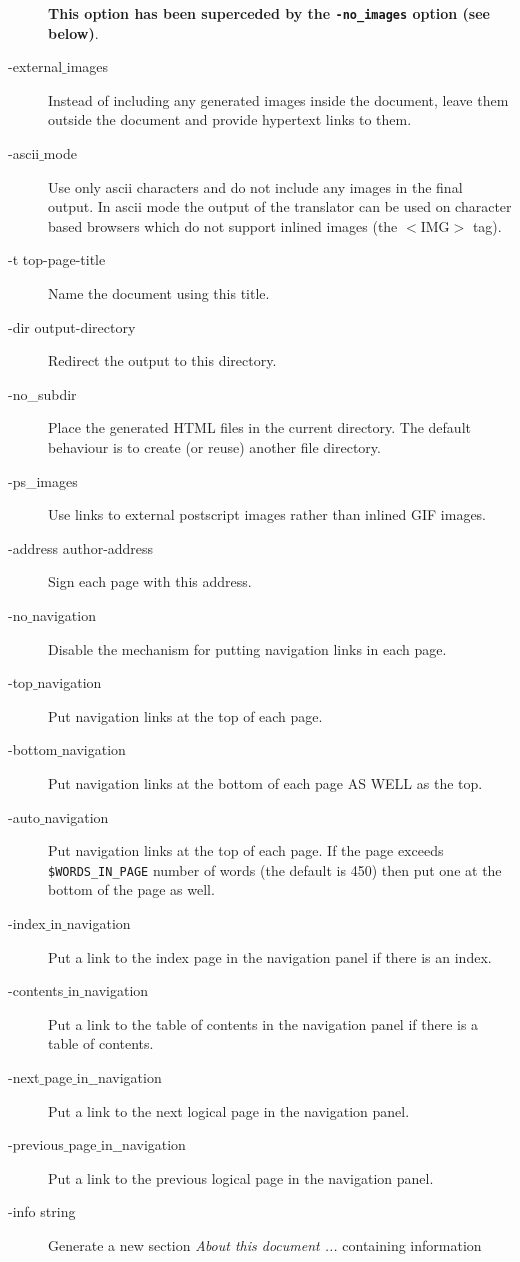 \begin{description}
{\bf This option has been superceded by the {\tt -no\_images} option
(see below)}.
\item [-external$\_$images]
Instead of including any generated images inside the document, leave them
outside the document and provide hypertext links to them.
\label{asciimode} 
\item [-ascii$\_$mode]
Use only ascii characters and do not include any images in the final output.
In ascii mode the output of the translator can be used on
character based browsers which do not support inlined images (the $<$IMG$>$ tag).
\item [-t top-page-title]
Name the document using this title.
\item [-dir output-directory]
Redirect the output to this directory. 
\item [-no\_subdir]
Place the generated HTML files  in the 
current directory. The default behaviour is to create (or reuse)
another file directory.
\item [-ps\_images]
Use links to external postscript images rather than inlined GIF images.
\item [-address author-address]
Sign each page with this address. \label{navoptions} 
\item [-no$\_$navigation]
Disable the mechanism for putting navigation links in 
each page.
\item [-top$\_$navigation]
Put navigation links 
at the top of each page.    
\item [-bottom$\_$navigation]
Put navigation links 
at the bottom of each page AS WELL as the top.
\item [-auto$\_$navigation]
Put navigation links
at the top of each page. If the page exceeds \verb|$WORDS_IN_PAGE| number of words
(the default is 450) then put one at the bottom of the page as well.
\item [-index$\_$in$\_$navigation]
Put a link to the index page in the navigation panel if there is an index.
\item [-contents$\_$in$\_$navigation]
Put a link to the table of contents in the navigation panel if there is a 
table of contents.
\item [-next$\_$page$\_$in$\_$$\_$navigation]
Put a link to the next logical page in the navigation panel.
\item [-previous$\_$page$\_$in$\_$$\_$navigation]
Put a link to the previous logical page in the navigation panel.
\item [-info string]
Generate a new section {\em About this document ...} containing information

\end{description}
